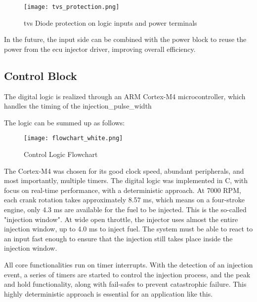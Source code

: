             \begin{figure}[H]
                \centering
                \texttt{[image: tvs\_protection.png]}
                \caption{\gls{tvs} Diode protection on logic inputs and power terminals}
                \label{fig:tvs_protection}
            \end{figure}

            In the future, the input side can be combined with the power block to reuse the power from the \gls{ecu} injector driver, improving overall efficiency.

        \subsection{Control Block}

            The digital logic is realized through an ARM Cortex-M4 microcontroller, which handles the timing of the \gls{injection_pulse_width} 

            The logic can be summed up as follows:

            \begin{figure}[H]
                \centering
                \texttt{[image: flowchart\_white.png]}
                \caption{Control Logic Flowchart}
                \label{fig:control_logic_flowchart}
            \end{figure}

            The Cortex-M4 was chosen for its good clock speed, abundant peripherals, and most importantly, multiple timers. The digital logic was implemented in C, with focus on real-time performance, with a \gls{deterministic} approach. At 7000 RPM, each crank rotation takes approximately 8.57 ms, which means on a four-stroke engine, only 4.3 ms are available for the fuel to be injected. This is the so-called "injection window". At wide open throttle, the injector uses almost the entire injection window, up to 4.0 ms to inject fuel. The system must be able to react to an input fast enough to ensure that the injection still takes place inside the injection window.

            All core functionalities run on timer interrupts. With the detection of an injection event, a series of timers are started to control the injection process, and the peak and hold functionality, along with fail-safes to prevent catastrophic failure. This highly \gls{deterministic} approach is essential for an application like this.

